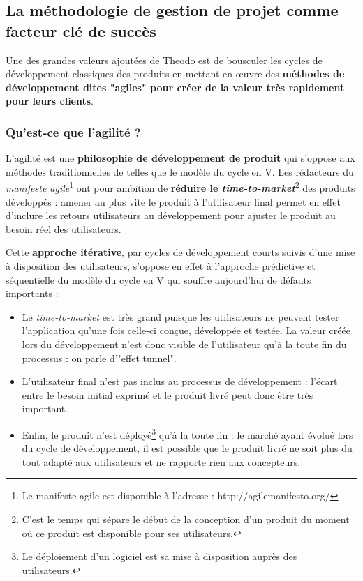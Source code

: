 \subsection{La méthodologie de gestion de projet comme facteur clé de succès}

Une des grandes valeurs ajoutées de Theodo est de bousculer les cycles de développement classiques des produits en mettant en œuvre des \textbf{méthodes de développement dites "agiles" pour créer de la valeur très rapidement pour leurs clients}.

\subsubsection*{Qu'est-ce que l'agilité ?}

L'agilité est une \textbf{philosophie de développement de produit} qui s'oppose aux méthodes traditionnelles de telles que le modèle du cycle en V. Les rédacteurs du \textit{manifeste agile}\footnote{Le manifeste agile est disponible à l'adresse : http://agilemanifesto.org/} ont pour ambition de \textbf{réduire le \textit{time-to-market}}\footnote{C'est le temps qui sépare le début de la conception d'un produit du moment où ce produit est disponible pour ses utilisateurs.} des produits développés : amener au plus vite le produit à l'utilisateur final permet en effet d'inclure les retours utilisateurs au développement pour ajuster le produit au besoin réel des utilisateurs.

Cette \textbf{approche itérative}, par cycles de développement courts suivis d'une mise à disposition des utilisateurs, s'oppose en effet à l'approche prédictive et séquentielle du modèle du cycle en V qui souffre aujourd'hui de défauts importants :
\begin{itemize}
\item Le \textit{time-to-market} est très grand puisque les utilisateurs ne peuvent tester l'application qu'une fois celle-ci conçue, développée et testée. La valeur créée lors du développement n'est donc visible de l'utilisateur qu'à la toute fin du processus : on parle d'"effet tunnel".
\item L'utilisateur final n'est pas inclus au processus de développement : l'écart entre le besoin initial exprimé et le produit livré peut donc être très important.
\item Enfin, le produit n'est déployé\footnote{Le déploiement d'un logiciel est sa mise à disposition auprès des utilisateurs.} qu'à la toute fin : le marché ayant évolué lors du cycle de développement, il est possible que le produit livré ne soit plus du tout adapté aux utilisateurs et ne rapporte rien aux concepteurs.
\end{itemize}


